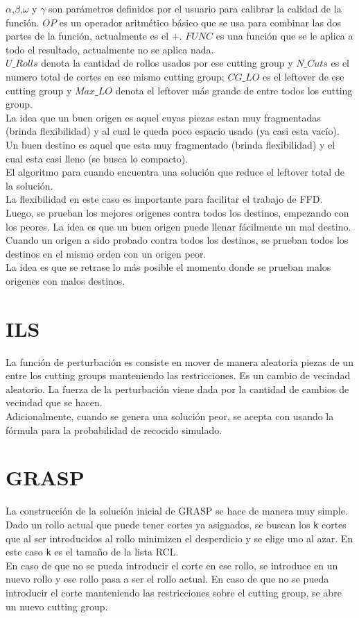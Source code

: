 \documentclass[letter,10pt]{article}
\begin{document}
$\alpha$,$\beta$,$\omega$ y $\gamma$ son par\'ametros definidos por el usuario para calibrar la calidad de la funci\'on. $OP$ es un operador aritm\'etico
b\'asico que se usa para combinar las dos partes de la funci\'on, actualmente es el $+$. $FUNC$ es una funci\'on que se le aplica a todo el resultado,
actualmente no se aplica nada.\\
\indent $U\_Rolls$ denota la cantidad de rollos usados por ese cutting group y $N\_Cuts$ es el numero total de cortes en ese mismo cutting group;
$CG\_LO$ es el leftover de ese cutting group y $Max\_LO$ denota el leftover m\'as grande de entre todos los cutting group.\\
\indent La idea que un buen origen es aquel cuyas piezas estan muy fragmentadas (brinda flexibilidad) y al cual le queda poco espacio usado
(ya casi esta vac\'io). Un buen destino es aquel que esta muy fragmentado (brinda flexibilidad) y el cual esta casi lleno (se busca lo compacto).\\
\indent El algoritmo para cuando encuentra una soluci\'on que reduce el leftover total de la soluci\'on.\\
\indent La flexibilidad en este caso es importante para facilitar el trabajo de FFD.\\
\indent Luego, se prueban los mejores origenes contra todos los destinos, empezando con los peores. La idea es que un buen origen puede llenar f\'acilmente
un mal destino. Cuando un origen a sido probado contra todos los destinos, se prueban todos los destinos en el mismo orden con un origen peor.\\
\indent La idea es que se retrase lo m\'as posible el momento donde se prueban malos origenes con malos destinos.

\section{ILS}
La funci\'on de perturbaci\'on es consiste en mover de manera aleatoria piezas de un entre los cutting groups manteniendo las restricciones.
Es un cambio de vecindad aleatorio. La fuerza de la perturbaci\'on viene dada por la cantidad de cambios de vecindad que se hacen.\\
\indent Adicionalmente, cuando se genera una soluci\'on peor, se acepta con usando la f\'ormula para la probabilidad de recocido simulado.

\section{GRASP}
La construcci\'on de la soluci\'on inicial de GRASP se hace de manera muy simple. Dado un rollo actual que puede tener cortes ya asignados, 
se buscan los \texttt{k} cortes que al ser introducidos al rollo minimizen el desperdicio y se elige uno al azar. En este caso \texttt{k} es el
tama\~no de la lista RCL.\\
\indent En caso de que no se pueda introducir el corte en ese rollo, se introduce en un nuevo rollo y ese rollo pasa a ser el rollo actual. En caso
de que no se pueda introducir el corte manteniendo las restricciones sobre el cutting group, se abre un nuevo cutting group.
\end{document}
